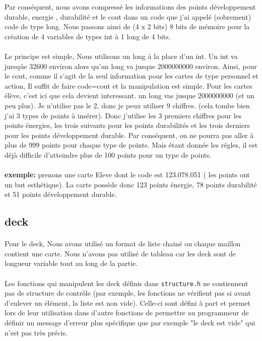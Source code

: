 \documentclass[12pt]{article}
\begin{document}
 Par conséquent, nous avons compressé les informations des points d\'eveloppement durable, energie , durabilit\'e et le cout dans un code que j'ai appel\'e (sobrement) code de type long. Nous passons ainsi de (4 x 2 bits) 8 bits  de mémoire pour la création de 4 variables de types int à 1 long de 4 bits.
 

\paragraph{}
Le principe est simple, Nous utilisons un long \` a la place d'un int.   Un int va jursq\'ue 32600 environ alors qu'un long va jusque 2000000000 environ. Ainsi, pour le cout, comme il s'agit de la seul information pour les cartes de type personnel et action, Il suffit de  faire code=cout et la manipulation est simple. Pour les cartes \'el\`eve, c'est ici que cela devient interessant. un  long vas jusque 2000000000 (et un peu plus). Je n'utilise pas le 2, donc je peux utiliser 9 chiffres. (cela tombe bien j'ai 3 types de points \`a ins\'erer). Donc j'utilise les 3 premiers chiffres pour les points énergies, les trois suivants pour les points durabilités et les trois derniers pour les points développement durable.  Par cons\'equent, on ne pourra pas aller à plus de 999 points pour chaque type de points. Mais étant donnée les régles, il est déjà difficile d'atteindre plus de 100 points pour un type de points.

\paragraph{}
\textbf{exemple:} prenons une carte Eleve dont le code est 123.078.051 ( les points ont un but esthétique). La carte posséde donc  123 points énergie, 78 points durabilité et 51 points développement durable.

\subsection{deck}

\paragraph{}
Pour le deck, Nous avons utilis\'e un format de liste chain\'e ou chaque maillon contient une carte. Nous n'avons pas utilisé de tableau car les deck sont de longueur variable tout au long de la partie.

\paragraph{}
Les fonctions qui manipulent les deck définis dans \texttt{structure.h} ne contiennent pas de structure de contrôle (par exemple, les fonctions ne vérifient pas si avant d'enlever un élément, la liste est non vide). Celle-ci sont défini à part et permet lors de leur utilisation dans d'autre fonctions de permettre au programmeur de définir un message d'erreur plus spécifique que par exemple "le deck est vide" qui n'est pas très précis.
\end{document}
